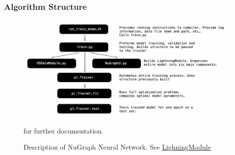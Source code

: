 \documentclass{beamer}
\begin{document}
\begin{frame}
	\frametitle{Algorithm Structure}


		\begin{figure}[h!]
			\includegraphics[width=1\textwidth]{images/model1.png}
			\caption{Description of NuGraph Neural Network. See \href{https://lightning.ai/docs/pytorch/stable/common/lightning\_module.html}{\color{blue} LighningModule}} for further documentation.
			\label{model1}
		\end{figure}
\end{frame}
\end{document}
